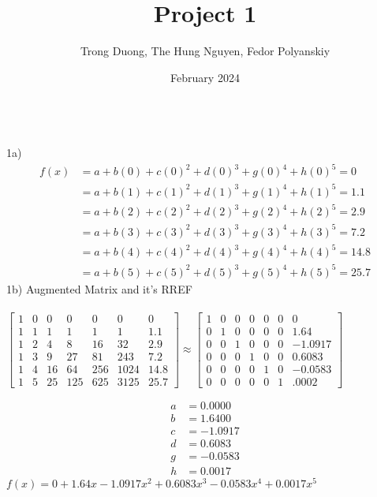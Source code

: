 \documentclass{article}
\title{Project 1}
\author{Trong Duong, The Hung Nguyen, Fedor Polyanskiy}
\date{February 2024}
\begin{document}
\maketitle

\\
1a)\\
\begin{align}
    f(x) & = a + b(0) + c(0)^2 + d(0)^3 + g(0)^4 + h(0)^5 = 0 \\
    & = a + b(1) + c(1)^2 + d(1)^3 + g(1)^4 + h(1)^5  = 1.1\\
    & = a + b(2) + c(2)^2 + d(2)^3 + g(2)^4 + h(2)^5  = 2.9 \\
    & = a + b(3) + c(3)^2 + d(3)^3 + g(3)^4 + h(3)^5  = 7.2 \\  
    & = a + b(4) + c(4)^2 + d(4)^3 + g(4)^4 + h(4)^5  = 14.8 \\  
    & = a + b(5) + c(5)^2 + d(5)^3 + g(5)^4 + h(5)^5  = 25.7
\end{align}
1b) Augmented Matrix and it's RREF \\
\\
$
\begin{bmatrix}
1 & 0 & 0 & 0 & 0 & 0 & 0 \\
1 & 1 & 1 & 1 & 1 & 1 & 1.1 \\
1 & 2 & 4 & 8 & 16 & 32 & 2.9 \\
1 & 3 & 9 & 27 & 81 & 243 & 7.2 \\
1 & 4 & 16 & 64 & 256 & 1024 & 14.8 \\
1 & 5 & 25 & 125 & 625 & 3125 & 25.7 
\end{bmatrix}  \approx
\begin{bmatrix}
1 & 0 & 0 & 0 & 0 & 0 & 0 \\
0 & 1 & 0 & 0 & 0 & 0 & 1.64 \\
0 & 0 & 1 & 0 & 0 & 0 & -1.0917 \\
0 & 0 & 0 & 1 & 0 & 0 & 0.6083 \\
0 & 0 & 0 & 0 & 1 & 0 & -0.0583 \\
0 & 0 & 0 & 0 & 0 & 1 & .0002 
\end{bmatrix}  
$

\begin{align*} 
    a &= 0.0000 \\
    b &= 1.6400 \\
    c &= -1.0917 \\ 
    d &= 0.6083  \\
    g &= -0.0583 \\
    h &= 0.0017  
\end{align*}
$f(x) = 0 + 1.64x - 1.0917x^2 + 0.6083x^3 - 0.0583x^4 + 0.0017x^5$ \\
\end{document}
